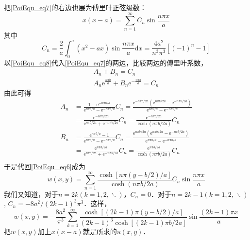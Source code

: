\begin{example}{}
\begin{equation}
    \end{equation}
    把\autoref{PoiEqu_eq7}的右边也展为傅里叶正弦级数：
    \begin{equation} \label{PoiEqu_eq8}
        x(x-a)=\sum_{n=1}^{\infty} C_{n} \sin \frac{n \pi x}{a}
    \end{equation}
    其中
    \begin{equation}
        C_{n}=\frac{2}{a} \int_{0}^{a}\left(x^{2}-a x\right) \sin \frac{n \pi x}{a} \mathrm{d} x=\frac{4 a^{2}}{n^{3} \pi^{3}}\left[(-1)^{n}-1\right]
    \end{equation}
    以\autoref{PoiEqu_eq8}代入\autoref{PoiEqu_eq7}的两边，比较两边的傅里叶系数，
    \begin{equation}
        \begin{array}{c}A_{n}+B_{n}=C_{n} \\ A_{n} \mathrm{e}^{\frac{n \pi b}{a}}+B_{n} \mathrm{e}^{-\frac{n \pi b}{a}}=C_{n}\end{array}
    \end{equation}
    由此可得
    \begin{equation}
        \begin{aligned}
            A_n&=\frac{1-\text{e}^{-n\pi b/a}}{\text{e}^{n\pi b/a}-\text{e}^{-n\pi b/a}}C_n=\frac{\text{e}^{-n\pi b/2a}\left( \text{e}^{n\pi b/2a}-\text{e}^{-n\pi b/2a} \right)}{\text{e}^{n\pi b/a}-\text{e}^{-n\pi b/a}}\\
            &=\frac{\text{e}^{-n\pi b/2a}}{\text{e}^{n\pi b/2a}+\text{e}^{-n\pi b/2a}}C_n=\frac{\text{e}^{-n\pi b/2a}}{\cosh \left( n\pi b/2a \right)}C_n\\
            B_n&=\frac{\text{e}^{n\pi b/a}-1}{\text{e}^{n\pi b/a}-\text{e}^{-n\pi b/a}}C_n=\frac{\text{e}^{n\pi b/2a}\left( \text{e}^{n\pi b/2a}-\text{e}^{-n\pi b/2a} \right)}{\text{e}^{n\pi b/a}-\text{e}^{-n\pi b/a}}\\
            &=\frac{\text{e}^{n\pi b/2a}}{\text{e}^{n\pi b/2a}+\text{e}^{-n\pi b/2a}}C_n=\frac{\text{e}^{n\pi b/2a}}{\cosh \left( n\pi b/2a \right)}C_n\\
        \end{aligned}
    \end{equation}
    于是代回\autoref{PoiEqu_eq6}成为
    \begin{equation}
        w(x, y)=\sum_{n=1}^{\infty} \frac{\cosh [n \pi(y-b / 2) / a]}{\cosh (n \pi b / 2 a)} C_{n} \sin \frac{n \pi x}{a}
    \end{equation}
    我们又知道，对于$n=2k(k=1,2,\ddots)$，$C_n=0$．对于$n=2k-1(k=1,2,\ddots)$, $C_n=-8a^2/(2k-1)^3\pi^3$．这样，
    \begin{equation}
        w(x, y)=-\frac{8 a^{2}}{\pi^{3}} \sum_{k=1}^{\infty} \frac{\cosh [(2 k-1) \pi(y-b / 2) / a]}{(2 k-1)^{3} \cosh [(2 k-1) \pi b / 2 a]} \sin \frac{(2 k-1) \pi x}{a}
    \end{equation}
    把$w(x,y)$加上$x(x-a)$就是所求的$u(x,y)$．
\end{example}
